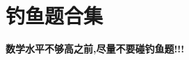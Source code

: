 \documentclass[../main.tex]{subfiles} %
\begin{document}
\chapter{钓鱼题合集}

{\large \textbf{数学水平不够高之前,尽量不要碰钓鱼题!!!}}

\vspace{1cm}



% 

% 

% 

% 

% 

% 

% 

% 

% 
\end{document}
